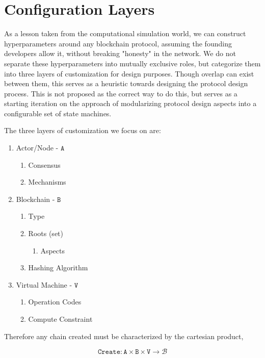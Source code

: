 \documentclass[12pt, titlepage, twocolumn]{report}
\begin{document}
\section{Configuration Layers}
As a lesson taken from the computational simulation world, we can construct hyperparameters around any blockchain protocol, assuming the founding developers allow it, without breaking "honesty" in the network. We do not separate these hyperparameters into mutually exclusive roles, but categorize them into three layers of customization for design purposes. Though overlap can exist between them, this serves as a heuristic towards designing the protocol design process. This is not proposed as the correct way to do this, but serves as a starting iteration on the approach of modularizing protocol design aspects into a configurable set of state machines.


The three layers of customization we focus on are:

\begin{enumerate}
 \item Actor/Node  - \(\texttt{A}\)
 \begin{enumerate}
		\item Consensus
		\item Mechanisms
	\end{enumerate}
 \item Blockchain - \(\texttt{B}\)
 \begin{enumerate}
		\item Type
		\item Roots (set)
		\begin{enumerate}
			\item Aspects
		\end{enumerate}
		\item Hashing Algorithm
	\end{enumerate}
 \item Virtual Machine - \(\texttt{V}\)
 \begin{enumerate}
		\item Operation Codes 
		\item Compute Constraint
	\end{enumerate}
\end{enumerate}

Therefore any chain created must be characterized by the cartesian product,

\begin{equation}
	\texttt{Create} : \texttt{A} \times \texttt{B} \times \texttt{V} \rightarrow \boldsymbol{\mathcal{B}}
\end{equation}
\end{document}
